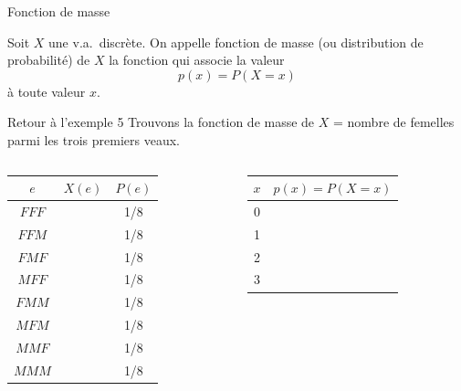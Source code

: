 \documentclass{BeamerTemplate}
\begin{document}
\begin{frame}[t]{Fonction de masse}
  \begin{defn}
    Soit $X$ une v.a.\ discrète. On appelle \alert{fonction de masse} (ou
    distribution de probabilité) de $X$ la fonction qui associe la valeur
    \[ p(x) = P(X = x) \]
    à toute valeur $x$.
  \end{defn}

\end{frame}

\begin{frame}[t]{Retour à l'exemple 5}
  Trouvons la fonction de masse de $X$ = nombre de femelles parmi les trois
  premiers veaux.

  \medskip
  \begin{columns}[T]
      \renewcommand{\arraystretch}{1.12}
      \begin{tabular}{c|c|c}
        $e$ & $X(e)$ & $P(e)$ \\
        \hline
        $FFF$ & & 1/8 \\
        $FFM$ & & 1/8 \\
        $FMF$ & & 1/8 \\
        $MFF$ & & 1/8 \\
        $FMM$ & & 1/8 \\
        $MFM$ & & 1/8 \\
        $MMF$ & & 1/8 \\
        $MMM$ & & 1/8 \\
      \end{tabular}
      \renewcommand{\arraystretch}{1.3}
      \begin{tabular}{c|c}
        $x$ & $p(x) = P(X = x)$ \\
        \hline
        0 & \\
        1 & \\
        2 & \\
        3 & \\
      \end{tabular}
  \end{columns}
\end{frame}
\end{document}
